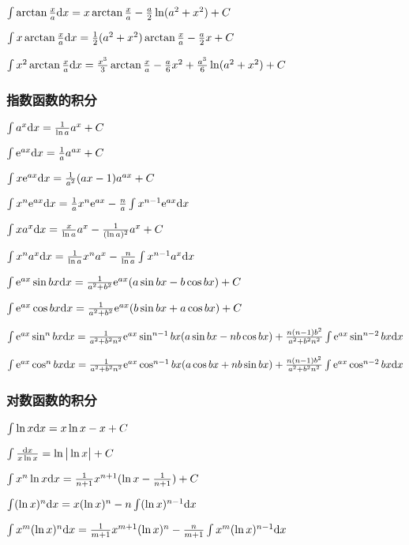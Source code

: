 \begin{footnotesize}
 $ \int \arctan \frac{x}{a} \mathrm{d} x=x \arctan \frac{x}{a}-\frac{a}{2}\ln (a^2+x^2)+C $

 $ \int x\arctan \frac{x}{a} \mathrm{d} x = \frac{1}{2}(a^2+x^2)\arctan \frac{x}{a} -\frac{a}{2}x+C $

 $ \int x^2 \arctan \frac{x}{a} \mathrm{d} x= \frac{x^3}{3} \arctan \frac{x}{a} - \frac{a}{6}x^2 + \frac{a^3}{6} \ln (a^2+x^2)+C $


\subsubsection*{指数函数的积分}


 $ \int a^x \mathrm{d} x= \frac{1}{\ln a} a^x + C$

 $ \int \mathrm{e} ^{ax}\mathrm{d} x=\frac{1}{a}a^{ax}+C $ 

 $ \int x \mathrm{e}  ^ {ax} \mathrm{d} x=\frac{1}{a^2}(ax-1)a^{ax} +C $

 $ \int x^n \mathrm{e} ^{ax} \mathrm{d} x=\frac{1}{a}x^n \mathrm{e} ^{ax}-\frac{n}{a} \int x^{n-1} \mathrm{e} ^ {ax} \mathrm{d} x $

 $ \int x a^x \mathrm{d} x = \frac{x}{\ln a}a^x-\frac{1}{(\ln a)^2}a^x+C $

 $ \int x^n a^x \mathrm{d} x= \frac{1}{\ln a}x^n a^x-\frac{n}{\ln a}\int x^{n-1}a^x \mathrm{d} x $

 $ \int \mathrm{e} ^{ax} \sin bx \mathrm{d} x = \frac{1}{a^2+b^2}\mathrm{e} ^{ax}(a \sin bx - b \cos bx)+C $

 $ \int \mathrm{e} ^{ax} \cos bx \mathrm{d} x = \frac{1}{a^2+b^2}\mathrm{e} ^{ax}(b \sin bx + a \cos bx)+C $

 $ \int \mathrm{e} ^{ax} \sin ^ n bx \mathrm{d} x=\frac{1}{a^2+b^2 n^2}\mathrm{e} ^{ax} \sin ^ {n-1} bx (a \sin bx -nb \cos bx) +\frac{n(n-1)b^2}{a^2+b^2 n^2}\int \mathrm{e} ^{ax} \sin ^{n-2} bx \mathrm{d} x $

 $ \int \mathrm{e} ^{ax} \cos ^ n bx \mathrm{d} x=\frac{1}{a^2+b^2 n^2}\mathrm{e} ^{ax} \cos ^ {n-1} bx (a \cos bx +nb \sin bx) +\frac{n(n-1)b^2}{a^2+b^2 n^2}\int \mathrm{e} ^{ax} \cos ^{n-2} bx \mathrm{d} x $

\subsubsection*{对数函数的积分}


 $ \int \ln x \mathrm{d} x = x \ln x - x + C$

 $ \int \frac{\mathrm{d} x}{x \ln x} =\ln \big | \ln x \big |+C $

 $ \int x^n \ln x \mathrm{d} x = \frac{1}{n+1}x^{n+1}(\ln x - \frac{1}{n+1} ) +C $

 $ \int (\ln x)^{n} \mathrm{d} x = x(\ln x)^ n - n \int (\ln x)^{n-1} \mathrm{d} x $

 $ \int x ^ m(\ln x)^n \mathrm{d} x=\frac{1}{m+1}x^{m+1} (\ln x)^n - \frac{n}{m+1} \int x^m(\ln x)^{n-1}\mathrm{d} x $ 

\end{footnotesize}